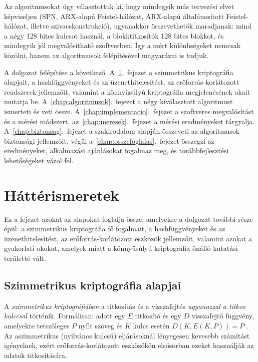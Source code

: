 \documentclass[a4paper,12pt]{report}
\theoremstyle{definition}
\theoremstyle{remark}
\begin{document}
Az algoritmusokat úgy választottuk ki, hogy mindegyik más tervezési elvet képviseljen (SPN, ARX-alapú Feistel-hálózat, ARX-alapú általánosított Feistel-hálózat, illetve szivacskonstrukció), ugyanakkor összevethetők maradjanak: mind a négy 128 bites kulcsot használ, a blokktitkosítók 128 bites blokkot, és mindegyik jól megvalósítható szoftverben. Így a mért különbségeket nemcsak közölni, hanem az algoritmusok felépítésével magyarázni is tudjuk.

A dolgozat felépítése a következő. A~\ref{chap:hatter}.~fejezet a szimmetrikus kriptográfia alapjait, a hashfüggvényeket és az üzenethitelesítést, az erőforrás-korlátozott rendszerek jellemzőit, valamint a könnyűsúlyú kriptográfia megjelenésének okait mutatja be. A~\ref{chap:algoritmusok}.~fejezet a négy kiválasztott algoritmust ismerteti és veti össze. A~\ref{chap:implementacio}.~fejezet a szoftveres megvalósítást és a mérési módszert, az~\ref{chap:meresek}.~fejezet a mérési eredményeket tárgyalja. A~\ref{chap:biztonsag}.~fejezet a szakirodalom alapján összeveti az algoritmusok biztonsági jellemzőit, végül a~\ref{chap:osszefoglalas}.~fejezet összegzi az eredményeket, alkalmazási ajánlásokat fogalmaz meg, és továbbfejlesztési lehetőségeket vázol fel.

\chapter{Háttérismeretek}\label{chap:hatter}

Ez a fejezet azokat az alapokat foglalja össze, amelyekre a dolgozat további része épül: a szimmetrikus kriptográfia fő fogalmait, a hashfüggvényeket és az üzenethitelesítést, az erőforrás-korlátozott eszközök jellemzőit, valamint azokat a gyakorlati okokat, amelyek miatt a könnyűsúlyú kriptográfia önálló kutatási területté vált.

\section{Szimmetrikus kriptográfia alapjai}\label{sec:szimmetrikus}

A \emph{szimmetrikus kriptográfiában} a titkosítás és a visszafejtés \emph{ugyanazzal a titkos kulccsal} történik. Formálisan: adott egy $E$ titkosító és egy $D$ visszafejtő függvény, amelyekre tetszőleges $P$ nyílt szöveg és $K$ kulcs esetén $D(K, E(K, P)) = P$ \cite{Stallings2017}. Az aszimmetrikus (nyilvános kulcsú) eljárásoknál lényegesen kevesebb számítást igényelnek, ezért erőforrás-korlátozott eszközökön elsősorban ezeket használják az adatok titkosítására.
\end{document}
